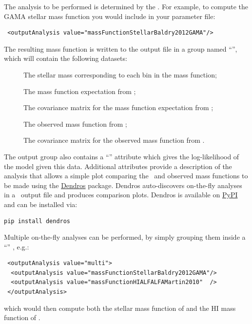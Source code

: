 The analysis to be performed is determined by the . For example, to compute the GAMA stellar mass function \citep{baldry_galaxy_2012} you would include in your parameter file:
\begin{verbatim}
 <outputAnalysis value="massFunctionStellarBaldry2012GAMA"/>
\end{verbatim}
The resulting mass function is written to the output file in a group named ``'', which will contain the following datasets:
\begin{description}
\item [] The stellar mass corresponding to each bin in the mass function;
\item [] The mass function expectation from \glc;
\item [] The covariance matrix for the mass function expectation from \glc;
\item [] The observed mass function from \cite{baldry_galaxy_2012};
\item [] The covariance matrix for the observed mass function from \cite{baldry_galaxy_2012}.
\end{description}
The output group also contains a ``'' attribute
which gives the log-likelihood of the model given this data.
Additional attributes provide a description of the analysis that
allows a simple plot comparing the \glc\ and observed mass functions
to be made using the
\href{https://github.com/galacticusorg/dendros}{Dendros} package.
Dendros auto-discovers on-the-fly analyses in a \glc\ output file
and produces comparison plots.
Dendros is available on \href{https://pypi.org/project/dendros/}{PyPI}
and can be installed via:
\begin{verbatim}
pip install dendros
\end{verbatim}

Multiple on-the-fly analyses can be performed, by simply grouping them inside a ``'' , e.g.:
\begin{verbatim}
 <outputAnalysis value="multi">
  <outputAnalysis value="massFunctionStellarBaldry2012GAMA"/>
  <outputAnalysis value="massFunctionHIALFALFAMartin2010"  />
 </outputAnalysis>
\end{verbatim}
which would then compute both the stellar mass function of \cite{baldry_galaxy_2012} and the HI mass function of \cite{martin_arecibo_2010}.

